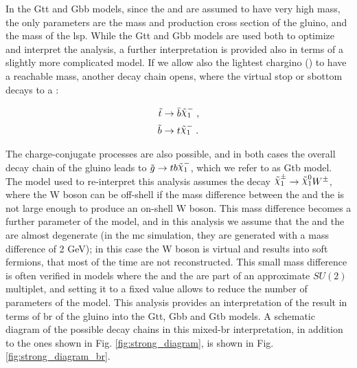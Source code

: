 In the Gtt and Gbb models, since the \stop and \sbottom are assumed to have very high mass, the only parameters are the mass and production cross section of the gluino, and the mass of the \gls{lsp}. While the Gtt and Gbb models are used both to optimize and interpret the analysis, a further interpretation is provided also in terms of a slightly more complicated model. If we allow also the lightest chargino (\chinoonepm) to have a reachable mass, another decay chain opens, where the virtual stop or sbottom decays to a \chinoonepm:

\begin{equation*}
\begin{split}
\stop &\to \bar{b} \chinoonem \; , \\
\sbottom &\to t \chinoonem \; .
\end{split}
\end{equation*}  

The charge-conjugate processes are also possible, and in both cases the overall decay chain of the gluino leads to $\gluino \to t b \chinoonem$, which we refer to as Gtb model.
The model used to re-interpret this analysis assumes the decay $\chinoonepm \to \ninoone W^{\pm}$, where the W boson can be off-shell if the mass difference between the \chinoonepm and the \ninoone is not large enough to produce an on-shell W boson. 
This mass difference becomes a further parameter of the model, and in this analysis we assume that the \chinoonepm and the \ninoone 
are almost degenerate (in the \gls{mc} simulation, they are generated with a mass difference of 2 GeV); in this case the W boson is virtual and results into soft fermions, that most of the time are not reconstructed. This small mass difference is often verified in models where the \chinoonepm and the \ninoone are part of an approximate $SU(2)$ multiplet, and setting it to a fixed value allows to reduce the number of parameters of the model. 
This analysis provides an interpretation of the result in terms of \gls{br} of the gluino into the Gtt, Gbb and Gtb models. 
A schematic diagram of the possible decay chains in this mixed-\gls{br} interpretation, in addition to the ones shown in Fig. \ref{fig:strong_diagram}, is shown in Fig. \ref{fig:strong_diagram_br}.

